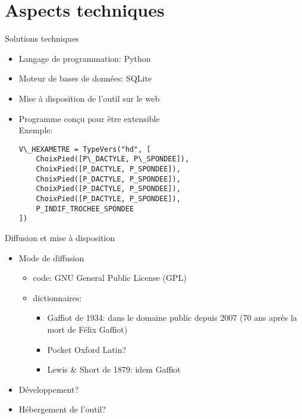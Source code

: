 \documentclass{beamer}
\begin{document}
\section{Aspects techniques}

\begin{frame}{Solutions techniques}

\begin{itemize}
\item Langage de programmation: Python
\item Moteur de bases de données: SQLite
\item Mise à disposition de l'outil sur le web

\vfill

\item Programme conçu pour être extensible\\
Exemple: 

\begin{verbatim}
V\_HEXAMETRE = TypeVers("hd", [
    ChoixPied([P\_DACTYLE, P\_SPONDEE]),
    ChoixPied([P_DACTYLE, P_SPONDEE]),
    ChoixPied([P_DACTYLE, P_SPONDEE]),
    ChoixPied([P_DACTYLE, P_SPONDEE]),
    ChoixPied([P_DACTYLE, P_SPONDEE]),
    P_INDIF_TROCHEE_SPONDEE
])
\end{verbatim}

\end{itemize}
\end{frame} %


\begin{frame}{Diffusion et mise à disposition}

\begin{itemize}
\item Mode de diffusion

\begin{itemize}
\item code: GNU General Public License (GPL)
\item dictionnaires:

\begin{itemize}
\item Gaffiot de 1934: dans le domaine public depuis 2007 (70 ans après la mort de Félix Gaffiot)
\item Pocket Oxford Latin?
\item Lewis \& Short de 1879: idem Gaffiot
\end{itemize}


\end{itemize}

\item Développement?

\item Hébergement de l'outil?

\end{itemize}
\end{frame} %
\end{document}
